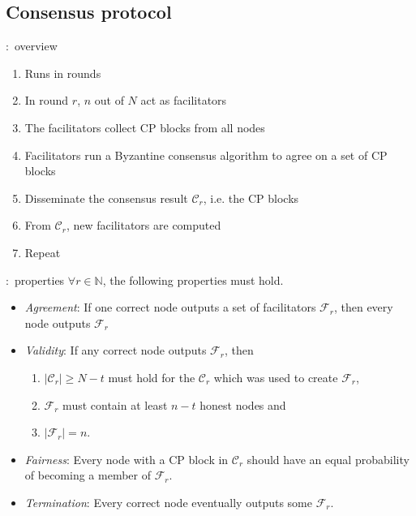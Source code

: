 \documentclass{beamer}
\newcommand{\C}{\mathcal{C}}
\newcommand{\F}{\mathcal{F}}
\begin{document}
\subsection{Consensus protocol}
\begin{frame}{\subsecname:~overview}
  \begin{enumerate}
    \item Runs in rounds
    \item In round $r$, $n$ out of $N$ act as facilitators
    \item The facilitators collect CP blocks from all nodes
    \item Facilitators run a Byzantine consensus algorithm to agree on a set of CP blocks
    \item Disseminate the consensus result $\C_r$, i.e. the CP blocks
    \item From $\C_r$, new facilitators are computed
    \item Repeat
  \end{enumerate}
\end{frame}

\begin{frame}{\subsecname:~properties}
\label{def:consensus}
$\forall r \in \mathbb{N}$, the following properties must hold.
\begin{itemize}
    \item \emph{Agreement}:
        If one correct node outputs a set of facilitators $\F_r$,
        then every node outputs $\F_r$
    \item \emph{Validity}:
        If any correct node outputs $\F_r$, then 
            \begin{enumerate}
                \item $|\C_r| \ge N - t$ must hold for the $\C_r$ which was used to create $\F_r$,
                \item $\F_r$ must contain at least $n - t$ honest nodes and
                \item $|\F_r| = n$.
            \end{enumerate}
    \item \emph{Fairness}:
        Every node with a CP block in $\C_r$ should have an equal probability of becoming a member of $\F_r$.
    \item \emph{Termination}:
        Every correct node eventually outputs some $\F_r$.
\end{itemize}
\end{frame}
\end{document}
